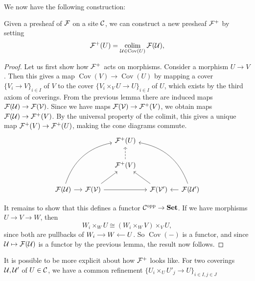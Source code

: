 \documentclass{article}
\DeclareMathOperator{\opp}{opp}
\DeclareMathOperator{\Cov}{Cov}
\DeclareMathOperator{\colim}{colim}
\begin{document}
We now have the following construction:
\begin{lemma}
    Given a presheaf of $\mathcal{F}$ on a site $\mathcal{C}$, we can construct
    a new presheaf $\mathcal{F}^+$ by setting
    \begin{equation*}
        \mcF^+(U) = \colim_{\mcU \in \Cov(U)} \mcF(\mcU),
    \end{equation*}
\end{lemma}
\begin{proof}
    Let us first show how $\mathcal{F}^+$ acts on morphisms. Consider
    a morphism $U \to V$. Then this gives a map $\Cov(V) \to \Cov(U)$
    by mapping a cover $\{V_i \to V\}_{i\in I}$ of $V$ to the cover
    $\{V_i \times_V U \to U\}_{i\in I}$ of $U$,
    which exists by the third axiom of coverings.
    From the previous lemma there are induced maps
    ${\mathcal{F}}(\mathcal{U}) \to {\mathcal{F}}(\mathcal{V})$.
    Since we have maps $\mathcal{F}(\mathcal{V}) \to \mathcal{F}^+(V)$,
    we obtain maps ${\mathcal{F}}(\mathcal{U}) \to \mathcal{F}^+(V)$.
    By the universal property of the colimit, this gives a unique map
    $\mathcal{F}^+(V) \to \mathcal{F}^+(U)$, making the cone diagrams commute.
    \begin{equation*}
        \begin{tikzcd}[column sep=small]
            &&\mcF^+(U) \ar[ddll, bend right, leftarrow]
            \ar[ddrr, bend left, leftarrow]\\
            &&\mcF^+(V)\uar[dashed]\\
            \mcF(\mcU) \rar &\mcF(\mcV)\ar[ur] \ar[rr]
            &&\mcF(\mcV') \ar[ul] &\mcF(\mcU') \lar
        \end{tikzcd}
    \end{equation*}

    It remains to show that this defines a functor $\mcC^{\opp}\to \Set$.
    If we have morphisms $U\to V \to W$, then
    \begin{equation*}
        W_i \times_W U \cong (W_i \times_W V) \times_V U,
    \end{equation*}
    since both are pullbacks of $\begin{tikzcd}
            [sep=small, cramped]
            W_i \rar & W & U \lar
        \end{tikzcd}$.
    So $\Cov(-)$ is a functor, and
    since $\mathcal{U} \mapsto \mathcal{F}(\mathcal{U})$ is a functor
    by the previous lemma, the result now follows.
\end{proof}
It is possible to be more explicit about how $\mathcal{F}^+$ looks like.
For two coverings $\mathcal{U}, \mathcal{U}'$ of $U \in \mathcal{C}$,
we have a common refinement $\{U_i \times_U U'_j \to U\}_{i\in I, j\in J}$
\end{document}
